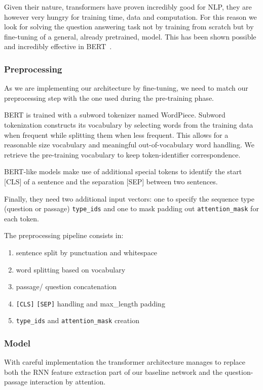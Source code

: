 \documentclass{article}
\newcommand{\code}[1]{\colorbox{light-gray}{\texttt{#1}}}
\begin{document}
Given their nature, transformers have proven incredibly good for NLP, they are however very hungry for training time, data and computation.
For this reason we look for solving the question answering task not by training from scratch but by fine-tuning of a general, already pretrained, model.
This has been shown possible and incredibly effective in BERT~\cite{devlin2019bert}.

\subsubsection{Preprocessing}
As we are implementing our architecture by fine-tuning, we need to match our preprocessing step with the one used during the pre-training phase.

BERT is trained with a subword tokenizer named WordPiece.
Subword tokenization constructs its vocabulary by selecting words from the training data when frequent while splitting them when less frequent.
This allows for a reasonable size vocabulary and meaningful out-of-vocabulary word handling.
We retrieve the pre-training vocabulary to keep token-identifier correspondence.

BERT-like models make use of additional special tokens to identify the start [CLS] of a sentence and the separation [SEP] between two sentences.

Finally, they need two additional input vectors: one to specify the sequence type (question or passage) \code{type\_ids} and one to mask padding out \code{attention\_mask} for each token.

The preprocessing pipeline consists in:
\begin{enumerate}
    \item sentence split by punctuation and whitespace
    \item word splitting based on vocabulary
    \item passage/ question concatenation 
    \item \code{[CLS]} \code{[SEP]} handling and max\_length padding
    \item \code{type\_ids} and \code{attention\_mask} creation
\end{enumerate}


\subsubsection{Model}

With careful implementation the transformer architecture manages to replace both the RNN feature extraction part of our baseline network and the question-passage interaction by attention.
\end{document}
